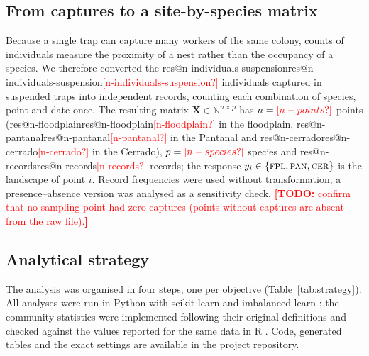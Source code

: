 \documentclass[10pt,a4paper,twocolumn]{article}
\makeatletter
\newif\ifshowtodos \showtodostrue
\newcommand{\TODO}[1]{\ifshowtodos\textcolor{red}{\textbf{[TODO:} #1\textbf{]}}\fi}
\newcommand{\res}[1]{\ifcsname res@#1\endcsname\csname res@#1\endcsname\else\textcolor{red}{[#1?]}\fi}
\newcommand{\Fpl}{\textsc{fpl}}
\newcommand{\Pan}{\textsc{pan}}
\newcommand{\Cer}{\textsc{cer}}
\makeatother
\begin{document}
\subsection{From captures to a site-by-species matrix}\label{sec:matrix}
Because a single trap can capture many workers of the same colony, counts of individuals measure
the proximity of a nest rather than the occupancy of a species. We therefore converted the
\res{n-individuals-suspension} individuals captured in suspended traps into independent records,
counting each combination of species, point and date once. The resulting matrix
$\mathbf{X}\in\mathbb{N}^{n\times p}$ has $n=\res{n-points}$ points (\res{n-floodplain} in the
floodplain, \res{n-pantanal} in the Pantanal and \res{n-cerrado} in the Cerrado), $p=\res{n-species}$
species and \res{n-records} records; the response $y_i\in\{\Fpl,\Pan,\Cer\}$ is the landscape of
point $i$. Record frequencies were used without transformation; a presence--absence version was
analysed as a sensitivity check. \TODO{confirm that no sampling point had zero captures (points
without captures are absent from the raw file).}

\subsection{Analytical strategy}\label{sec:strategy}
The analysis was organised in four steps, one per objective (Table~\ref{tab:strategy}). All
analyses were run in Python with scikit-learn \citep{pedregosa2011} and imbalanced-learn
\citep{lemaitre2017}; the community statistics were implemented following their original
definitions and checked against the values reported for the same data in R
\citep{leite_companion}. Code, generated tables and the exact settings are available in the project
repository.
\end{document}
